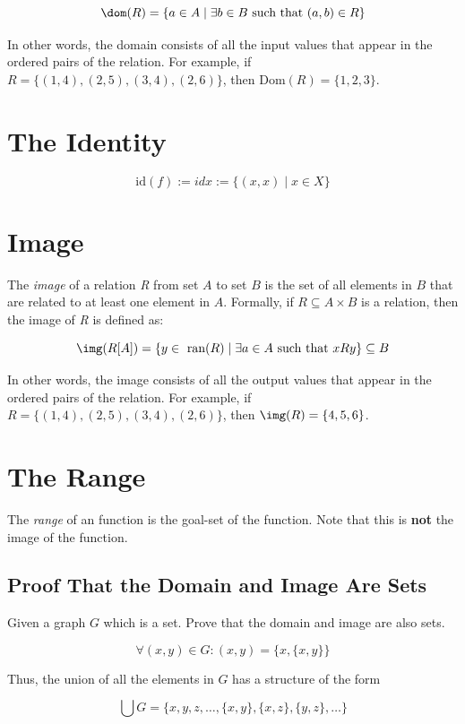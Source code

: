 \[
	\dom(R) = \{a \in A \mid \exists b \in B \text{ such that } (a,b) \in R\}
\]

In other words, the domain consists of all the input values that appear in the ordered pairs of the 
relation. For example, if \(R = \{(1,4), (2,5), (3,4), (2,6)\}\), then \(\text{Dom}(R) = \{1, 2, 3\}\).

\section{The Identity}

\[
	\text{id}(f):= idx:= \{(x, x)\mid x \in X\}
\]

\section{Image}

The \emph{image} of a relation \emph{R} from set \(A\) to set \(B\) is the set 
of all elements in \(B\) that are related to at least one element in \(A\). Formally, if 
\(R \subseteq A \times B\) is a relation, then the image of \emph{R} is defined as:

\[
	\img(R[A]) = \{y \in \text{ ran}(R) \mid \exists a \in A \text{ such that } xRy\} \subseteq B
\]

In other words, the image consists of all the output values that appear in the ordered pairs of the 
relation. For example, if \(R = \{(1,4), (2,5), (3,4), (2,6)\}\), then \(\img(R) = \{4, 5, 6\}\).

\section{The Range}

The \emph{range} of an function is the goal-set of the function. Note that this is \textbf{not} the image of the function.

\subsection{Proof That the Domain and Image Are Sets}

Given a graph \(G\) which is a set. Prove that the domain and image are also sets.

\[
	\forall (x,y) \in G: (x,y) = \{x, \{x, y\}\}
\]

Thus, the union of all the elements in \(G\) has a structure of the form

\[
	\bigcup G = \{x, y, z, \dots, \{x, y\}, \{x, z\}, \{y, z\}, \dots\}
\]

